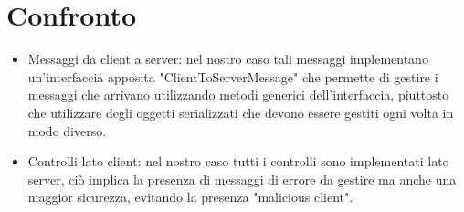 \documentclass[12pt]{article}
\begin{document}
\section{Confronto}

\begin{itemize}
    \item Messaggi da client a server: nel nostro caso tali messaggi implementano un'interfaccia apposita "ClientToServerMessage" che permette di gestire i messaggi che arrivano utilizzando metodi generici dell'interfaccia, piuttosto che utilizzare degli oggetti serializzati che devono essere gestiti ogni volta in modo diverso.
    \item Controlli lato client: nel nostro caso tutti i controlli sono implementati lato server, ciò implica la presenza di messaggi di errore da gestire ma anche una maggior sicurezza, evitando la presenza "malicious client".
\end{itemize}
\end{document}
